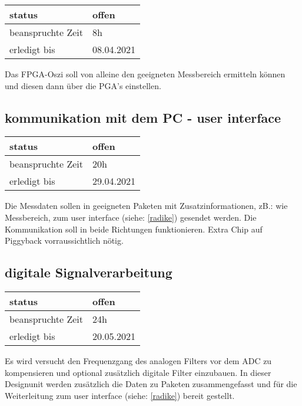 \begin{tabular}[h]{|l|l|} %
	\hline
	status & offen\\
	\hline
	beanspruchte Zeit & 8h \\
	\hline
	erledigt bis & 08.04.2021 \\
	\hline
\end{tabular}
Das FPGA-Oszi soll von alleine den geeigneten Messbereich ermitteln können und diesen dann über die PGA's einstellen.

\subsection{kommunikation mit dem PC - user interface}

\begin{tabular}[h]{|l|l|} %
	\hline
	status & offen\\
	\hline
	beanspruchte Zeit & 20h \\
	\hline
	erledigt bis & 29.04.2021 \\
	\hline
\end{tabular}
Die Messdaten sollen in geeigneten Paketen mit Zusatzinformationen, zB.: wie Messbereich, zum user interface (siehe: \ref{radike}) gesendet werden. Die Kommunikation soll in beide Richtungen funktionieren. Extra Chip auf Piggyback vorraussichtlich nötig.

\subsection{digitale Signalverarbeitung}

\begin{tabular}[h]{|l|l|} %
	\hline
	status & offen\\
	\hline
	beanspruchte Zeit & 24h \\
	\hline
	erledigt bis & 20.05.2021 \\
	\hline
\end{tabular}
Es wird versucht den Frequenzgang des analogen Filters vor dem ADC zu kompensieren und optional zusätzlich digitale Filter einzubauen. In dieser Designunit werden zusätzlich die Daten zu Paketen zusammengefasst und für die Weiterleitung zum user  interface (siehe: \ref{radike}) bereit gestellt.

